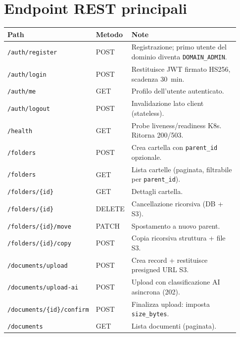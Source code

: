 \chapter{Endpoint REST principali}
\label{app:api}

\begin{longtable}{p{0.32\linewidth} p{0.14\linewidth} p{0.47\linewidth}}
\toprule
\textbf{Path} & \textbf{Metodo} & \textbf{Note} \\
\midrule
\endhead
\texttt{/auth/register}                       & POST   & Registrazione; primo utente del dominio diventa \texttt{DOMAIN\_ADMIN}. \\
\texttt{/auth/login}                          & POST   & Restituisce JWT firmato HS256, scadenza 30~min. \\
\texttt{/auth/me}                             & GET    & Profilo dell'utente autenticato. \\
\texttt{/auth/logout}                         & POST   & Invalidazione lato client (stateless). \\
\midrule
\texttt{/health}                              & GET    & Probe liveness/readiness K8s. Ritorna 200/503. \\
\midrule
\texttt{/folders}                             & POST   & Crea cartella con \texttt{parent\_id} opzionale. \\
\texttt{/folders}                             & GET    & Lista cartelle (paginata, filtrabile per \texttt{parent\_id}). \\
\texttt{/folders/\{id\}}                      & GET    & Dettagli cartella. \\
\texttt{/folders/\{id\}}                      & DELETE & Cancellazione ricorsiva (DB + S3). \\
\texttt{/folders/\{id\}/move}                 & PATCH  & Spostamento a nuovo parent. \\
\texttt{/folders/\{id\}/copy}                 & POST   & Copia ricorsiva struttura + file S3. \\
\midrule
\texttt{/documents/upload}                    & POST   & Crea record + restituisce presigned URL S3. \\
\texttt{/documents/upload-ai}                 & POST   & Upload con classificazione AI asincrona (202). \\
\texttt{/documents/\{id\}/confirm}            & POST   & Finalizza upload: imposta \texttt{size\_bytes}. \\
\texttt{/documents}                           & GET    & Lista documenti (paginata). \\

\end{longtable}
